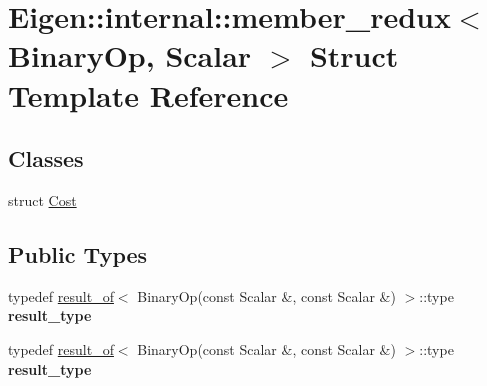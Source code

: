 \hypertarget{struct_eigen_1_1internal_1_1member__redux}{}\section{Eigen\+:\+:internal\+:\+:member\+\_\+redux$<$ Binary\+Op, Scalar $>$ Struct Template Reference}
\label{struct_eigen_1_1internal_1_1member__redux}
\subsection*{Classes}
\begin{DoxyCompactItemize}
\item 
struct \hyperlink{struct_eigen_1_1internal_1_1member__redux_1_1_cost}{Cost}
\end{DoxyCompactItemize}
\subsection*{Public Types}
\begin{DoxyCompactItemize}
\item 
\mbox{\label{struct_eigen_1_1internal_1_1member__redux_a970e1fe440e4fa72b4775865a0ac3071}} 
typedef \hyperlink{struct_eigen_1_1internal_1_1result__of}{result\+\_\+of}$<$ Binary\+Op(const Scalar \&, const Scalar \&) $>$\+::type {\bfseries result\+\_\+type}
\item 
\mbox{\label{struct_eigen_1_1internal_1_1member__redux_a970e1fe440e4fa72b4775865a0ac3071}} 
typedef \hyperlink{struct_eigen_1_1internal_1_1result__of}{result\+\_\+of}$<$ Binary\+Op(const Scalar \&, const Scalar \&) $>$\+::type {\bfseries result\+\_\+type}
\end{DoxyCompactItemize}
